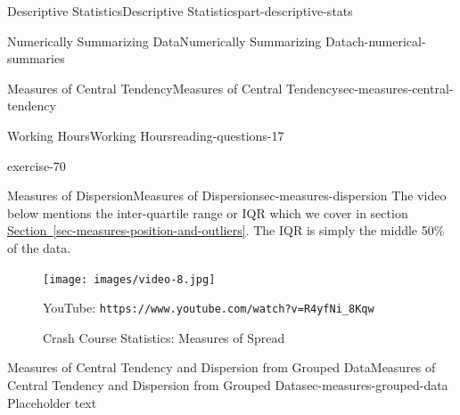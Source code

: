 \documentclass[oneside,10pt,]{book}
\newcommand{\mono}[1]{\texttt{#1}}
\numberwithin{equation}{section}
\newlength{\qrsize}
\newlength{\previewwidth}
\begin{document}
\begin{partptx}{Descriptive Statistics}{}{Descriptive Statistics}{}{}{part-descriptive-stats}
\begin{chapterptx}{Numerically Summarizing Data}{}{Numerically Summarizing Data}{}{}{ch-numerical-summaries}
\begin{sectionptx}{Measures of Central Tendency}{}{Measures of Central Tendency}{}{}{sec-measures-central-tendency}
\begin{reading-questions-subsection-numberless}{Working Hours}{}{Working Hours}{}{}{reading-questions-17}
\begin{divisionexercise}{2}{}{}{exercise-70}
\end{divisionexercise}%
\end{reading-questions-subsection-numberless}
\end{sectionptx}
%
%
\typeout{************************************************}
\typeout{************************************************}
%
\begin{sectionptx}{Measures of Dispersion}{}{Measures of Dispersion}{}{}{sec-measures-dispersion}
\hypertarget{p-99}{}%
The video below mentions the inter-quartile range or IQR which we cover in section \hyperref[sec-measures-position-and-outliers]{Section~\ref{sec-measures-position-and-outliers}}. The IQR is simply the middle 50\% of the data.%
\begin{figure}
\centering
\setlength{\qrsize}{9em}
\setlength{\previewwidth}{\linewidth}
\addtolength{\previewwidth}{-\qrsize}
\begin{tcbraster}[raster columns=2, raster column skip=1pt, raster halign=center, raster force size=false, raster left skip=0pt, raster right skip=0pt]%
\begin{tcolorbox}[previewstyle, width=\previewwidth]%
\texttt{[image: images/video-8.jpg]}%
\end{tcolorbox}%
\begin{tcolorbox}[qrstyle]%
{\hypersetup{urlcolor=black}}%
\end{tcolorbox}%
\begin{tcolorbox}[captionstyle]%
\small YouTube: \mono{https://www.youtube.com/watch?v=R4yfNi\_8Kqw}\end{tcolorbox}%
\end{tcbraster}%
\caption{Crash Course Statistics: Measures of Spread\label{figure-9}}
\end{figure}
\end{sectionptx}
%
%
\typeout{************************************************}
\typeout{************************************************}
%
\begin{sectionptx}{Measures of Central Tendency and Dispersion from Grouped Data}{}{Measures of Central Tendency and Dispersion from Grouped Data}{}{}{sec-measures-grouped-data}
\hypertarget{p-100}{}%
Placeholder text%
\end{sectionptx}
%
%
\typeout{************************************************}

\end{chapterptx}
\end{partptx}
\end{document}
